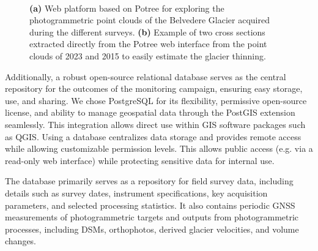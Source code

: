 \begin{figure}[p]
  \centering
     \\
    \caption{\textbf{(a)} Web platform based on Potree for exploring the photogrammetric point clouds of the Belvedere Glacier acquired during the different surveys. \textbf{(b)} Example of two cross sections extracted directly from the Potree web interface from the point clouds of 2023 and 2015 to easily estimate the glacier thinning.}
    \label{fig:3:potree}
\end{figure}

Additionally, a robust open-source relational database serves as the central repository for the outcomes of the monitoring campaign, ensuring easy storage, use, and sharing. 
We chose PostgreSQL for its flexibility, permissive open-source license, and ability to manage geospatial data through the PostGIS extension seamlessly. 
This integration allows direct use within GIS software packages such as QGIS. 
Using a database centralizes data storage and provides remote access while allowing customizable permission levels. 
This allows public access (e.g. via a read-only web interface) while protecting sensitive data for internal use. 

The database primarily serves as a repository for field survey data, including details such as survey dates, instrument specifications, key acquisition parameters, and selected processing statistics. 
It also contains periodic GNSS measurements of photogrammetric targets and outputs from photogrammetric processes, including DSMs, orthophotos, derived glacier velocities, and volume changes.

